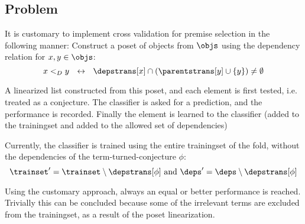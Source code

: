 \subsection{Problem}
It is customary to implement cross validation for premise selection in the following manner:
Construct a poset of objects from $\objs$ using the dependency relation for $x, y \in \objs$:
\[
	x <_D y ~~\leftrightarrow~~ \depstrans[x] \cap (\parentstrans[y] \cup \{y\}) \neq \emptyset
\]

A linearized list constructed from this poset, and each element is
	first tested, i.e. treated as a conjecture.
	The classifier is asked for a prediction, and the performance is recorded.
	Finally the element is learned to the classifier (added to the trainingset and added to the allowed set of dependencies)

Currently, the classifier is trained using the entire trainingset of the fold, without the dependencies of the term-turned-conjecture $\phi$:
\[
	\trainset' = \trainset \setminus \depstrans[\phi] ~\text{and}~ \deps' = \deps \setminus \depstrans[\phi]
\]

Using the customary approach, always an equal or better performance is reached.
Trivially this can be concluded because some of the irrelevant terms are excluded from the trainingset, as a result of the poset linearization.
